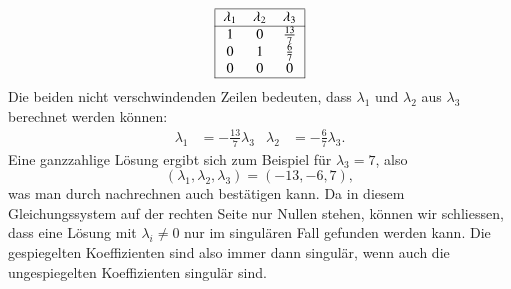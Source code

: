\begin{beispiel}
\begin{align*}
\begin{tabular}{|>{$}c<{$}>{$}c<{$}>{$}c<{$}|}
\hline
\lambda_1&\lambda_2&\lambda_3\\
\hline
1&0&\frac{13}{7}\\
0&1&\frac67\\
0&0&0\\
\hline
\end{tabular}
\end{align*}
Die beiden nicht verschwindenden Zeilen bedeuten, dass $\lambda_1$ und
$\lambda_2$ aus $\lambda_3$ berechnet werden können:
\begin{align*}
\lambda_1&=-\frac{13}7\lambda_3&\lambda_2&=-\frac{6}7\lambda_3.
\end{align*}
Eine ganzzahlige Lösung ergibt sich zum Beispiel für $\lambda_3=7$,
also
\[
(
\lambda_1,
\lambda_2,
\lambda_3
)
=(
-13,-6,7
),
\]
was man durch nachrechnen auch bestätigen kann.
Da in diesem Gleichungssystem
auf der rechten Seite nur Nullen stehen, können wir schliessen,
dass eine Lösung mit $\lambda_i\ne 0$ nur im singulären Fall gefunden
werden kann.
Die gespiegelten Koeffizienten sind also immer dann singulär,
wenn auch die ungespiegelten Koeffizienten singulär sind.


\end{beispiel}
